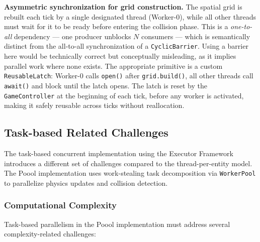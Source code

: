 \documentclass[12pt,a4paper]{article}
\begin{document}
\textbf{Asymmetric synchronization for grid construction.} The spatial grid
is rebuilt each tick by a single designated thread (Worker-0), while all other
threads must wait for it to be ready before entering the collision phase. This
is a \emph{one-to-all} dependency — one producer unblocks $N$ consumers —
which is semantically distinct from the all-to-all synchronization of a
\texttt{CyclicBarrier}. Using a barrier here would be technically correct but
conceptually misleading, as it implies parallel work where none exists.
The appropriate primitive is a custom \texttt{ReusableLatch}: Worker-0 calls
\texttt{open()} after \texttt{grid.build()}, all other threads call
\texttt{await()} and block until the latch opens. The latch is reset by the
\texttt{GameController} at the beginning of each tick, before any worker
is activated, making it safely reusable across ticks without reallocation.

\subsection{Task-based Related Challenges}
The task-based concurrent implementation using the Executor Framework introduces a different 
set of challenges compared to the thread-per-entity model. 
The Poool implementation uses work-stealing task decomposition via \texttt{WorkerPool} to parallelize physics 
updates and collision detection.
\subsubsection{Computational Complexity}
Task-based parallelism in the Poool implementation must address several complexity-related challenges:
 
\end{document}
